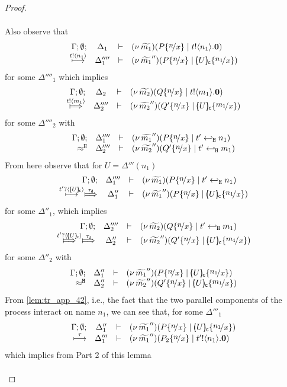 \begin{proof}
\begin{enumerate}[1.]
\begin{enumerate}[(a)]
\begin{itemize}
\begin{eqnarray}
											\label{lem:tr_app_43}
										\end{eqnarray}
										Also observe that %
										\[
											\mhorel{\Gamma}{\Delta_1}{\newsp{\widetilde{m_1}}{P \subst{n}{x} \Par \bout{t}{n_1} \inact}}
											{ \hby{\bactout{t}{n_1}} }
											{\Delta_1''''}{}{\newsp{\widetilde{m_1}''}{P \subst{n}{x} \Par \omapchar{U} \subst{n_1}{x}}}
										\]
										for some $\Delta''''_1$
										which implies
										\[
											\mhorel{\Gamma}{\Delta_2}{\newsp{\widetilde{m_2}}{Q \subst{n}{x} \Par \bout{t}{m_1} \inact}}
											{ \Hby{\bactout{t}{m_1}} }
											{\Delta_2''''}{}{\newsp{\widetilde{m_2}''}{Q' \subst{n}{x} \Par \omapchar{U} \subst{m_1}{x}}}
										\]
										for some $\Delta''''_2$
										with
										\[
										\mhorel{\Gamma}{\Delta_1''''}{\newsp{\widetilde{m_1}''}{P \subst{n}{x} \Par \htrigger{t'}{n_1}}}
										{\hwb}
										{\Delta_2''''}{}{\newsp{\widetilde{m_2}''}{Q' \subst{n}{x} \Par \htrigger{t'}{m_1}}}
										\]
										From here observe that for $U = \Delta'''(n_1)$
										\[
										\mhorel{\Gamma}{\Delta_1''''}{\newsp{\widetilde{m_1}}{P \subst{n}{x} \Par \htrigger{t'}{n_1}}}
										{  \hby{\bactinp{t'}{\omapchar{U}}} \Hby{\dtau} }
										{\Delta_1''}{}{\newsp{\widetilde{m_1}''}{P \subst{n}{x} \Par \omapchar{U} \subst{n_1}{x}}}
										\]
										for some $\Delta''_1$,
										which implies
										\[
										\mhorel{\Gamma}{\Delta_2''''}{\newsp{\widetilde{m_2}}{Q \subst{n}{x} \Par \htrigger{t'}{m_1}}}
										{ \Hby{\bactinp{t'}{\omapchar{U}}} \Hby{\dtau} }
										{\Delta_2''}{}{\newsp{\widetilde{m_2}''}{Q' \subst{n}{x} \Par \omapchar{U} \subst{m_1}{x}}}
										\]
										for some $\Delta''_2$
										with
										\[
											\mhorel{\Gamma}{\Delta_1''}{\newsp{\widetilde{m_1}''}{P \subst{n}{x} \Par \omapchar{U} \subst{n_1}{x}}}
											{\hwb}
											{\Delta_2''}{}{\newsp{\widetilde{m_2}''}{Q' \subst{n}{x} \Par \omapchar{U} \subst{m_1}{x}}}
										\]
										From \eqref{lem:tr_app_42}, i.e., the fact that the two parallel components of the process interact on name $n_1$, we can see that, for some $\Delta'''_1$
										\[
											\mhorel{\Gamma}{\Delta_1''}{\newsp{\widetilde{m_1}''}{P \subst{n}{x} \Par \omapchar{U} \subst{n_1}{x}}}
											{ \hby{\tau} }
											{\Delta_1'''}{}{\newsp{\widetilde{m_1}''}{P_2 \subst{n}{x} \Par \bout{t'}{n_1} \inact}}
										\]
										which implies from Part 2 of this lemma
										\begin{eqnarray}

\end{eqnarray}
\end{itemize}
\end{enumerate}
\end{enumerate}
\end{proof}
